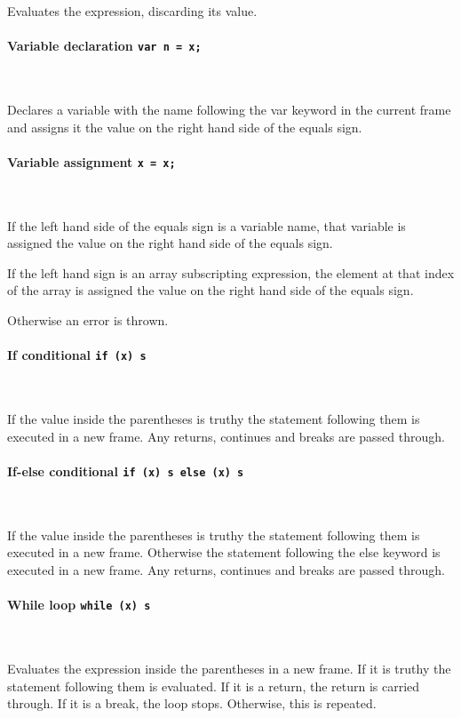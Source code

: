 Evaluates the expression, discarding its value.

\paragraph{Variable declaration \quad \texttt{var n = x;} } \

Declares a variable with the name following the var keyword in the current frame and assigns it the value on the right hand side of the equals sign.

\paragraph{Variable assignment \quad \texttt{x = x;} } \

If the left hand side of the equals sign is a variable name, that variable is assigned the value on the right hand side of the equals sign.

If the left hand sign is an array subscripting expression, the element at that index of the array is assigned the value on the right hand side of the equals sign.

Otherwise an error is thrown.

\paragraph{If conditional \quad \texttt{if (x) s} } \

If the value inside the parentheses is truthy the statement following them is executed in a new frame. Any returns, continues and breaks are passed through.

\paragraph{If-else conditional \quad \texttt{if (x) s else (x) s} } \

If the value inside the parentheses is truthy the statement following them is executed in a new frame. Otherwise the statement following the else keyword is executed in a new frame. Any returns, continues and breaks are passed through.

\paragraph{While loop \quad \texttt{while (x) s}} \

Evaluates the expression inside the parentheses in a new frame. If it is truthy the statement following them is evaluated. If it is a return, the return is carried through. If it is a break, the loop stops. Otherwise, this is repeated.


